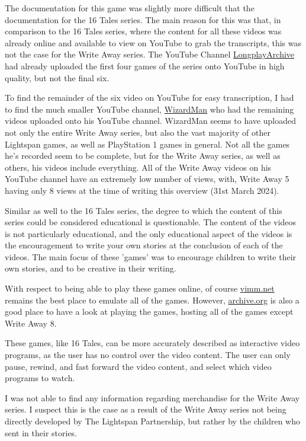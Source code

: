 The documentation for this game was slightly more difficult that the documentation for the 16 Tales series.
The main reason for this was that, in comparison to the 16 Tales series, where the content for all these videos was already online and available to view on YouTube to grab the transcripts, this was not the case for the Write Away series.
The YouTube Channel \href{https://www.youtube.com/@longplayarchive}{LongplayArchive} had already uploaded the first four games of the series onto YouTube in high quality, but not the final six.

To find the remainder of the six video on YouTube for easy transcription, I had to find the much smaller YouTube channel, \href{https://www.youtube.com/@WizardmanTonight}{WizardMan} who had the remaining videos uploaded onto his YouTube channel.
WizardMan seems to have uploaded not only the entire Write Away series, but also the vast majority of other Lightspan games, as well as PlayStation 1 games in general.
Not all the games he's recorded seem to be complete, but for the Write Away series, as well as others, his videos include everything.
All of the Write Away videos on his YouTube channel have an extremely low number of views, with, Write Away 5 having only 8 views at the time of writing this overview (31st March 2024).

Similar as well to the 16 Tales series, the degree to which the content of this series could be considered educational is questionable.
The content of the videos is not particularly educational, and the only educational aspect of the videos is the encouragement to write your own stories at the conclusion of each of the videos.
The main focus of these 'games' was to encourage children to write their own stories, and to be creative in their writing.

With respect to being able to play these games online, of course \href{https://vimm.net}{vimm.net} remains the best place to emulate all of the games.
However, \href{https://archive.org}{archive.org} is also a good place to have a look at playing the games, hosting all of the games except Write Away 8.

These games, like 16 Tales, can be more accurately described as interactive video programs, as the user has no control over the video content.
The user can only pause, rewind, and fast forward the video content, and select which video programs to watch.

I was not able to find any information regarding merchandise for the Write Away series.
I suspect this is the case as a result of the Write Away series not being directly developed by The Lightspan Partnership, but rather by the children who sent in their stories.

